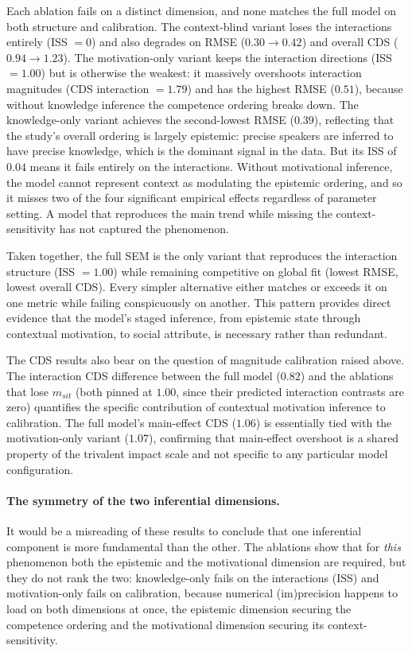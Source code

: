 \documentclass[12pt,a4paper]{article}
\begin{document}
Each ablation fails on a distinct dimension, and none matches the full model on
both structure and calibration. The context-blind variant loses the interactions
entirely (ISS $= 0$) and also degrades on RMSE ($0.30 \to 0.42$) and overall
CDS ($0.94 \to 1.23$). The motivation-only variant keeps the interaction
directions (ISS $= 1.00$) but is otherwise the weakest: it massively overshoots
interaction magnitudes (CDS interaction $= 1.79$) and has the highest RMSE
($0.51$), because without knowledge inference the competence ordering breaks
down. The knowledge-only variant achieves the second-lowest RMSE ($0.39$),
reflecting that the study's overall ordering is largely epistemic: precise
speakers are inferred to have precise knowledge, which is the dominant signal in
the data. But its ISS of $0.04$ means it fails entirely on the interactions.
Without motivational inference, the model cannot represent context as modulating
the epistemic ordering, and so it misses two of the four significant empirical
effects regardless of parameter setting. A model that reproduces the main trend
while missing the context-sensitivity has not captured the phenomenon.

Taken together, the full SEM is the only variant that reproduces the interaction
structure (ISS $= 1.00$) while remaining competitive on global fit (lowest RMSE,
lowest overall CDS). Every simpler alternative either matches or exceeds it on
one metric while failing conspicuously on another. This pattern provides
direct evidence that the model's staged inference, from epistemic state through
contextual motivation, to social attribute, is necessary rather than redundant.

The CDS results also bear on the question of magnitude calibration raised
above. The interaction CDS difference between the full model ($0.82$) and the
ablations that lose $m_{sit}$ (both pinned at $1.00$, since their predicted
interaction contrasts are zero) quantifies the specific contribution of
contextual motivation inference to calibration. The full model's main-effect CDS
($1.06$) is essentially tied with the motivation-only variant ($1.07$),
confirming that main-effect overshoot is a shared property of the trivalent
impact scale and not specific to any particular model configuration.

\paragraph{The symmetry of the two inferential dimensions.}
It would be a misreading of these results to conclude that one inferential
component is more fundamental than the other. The ablations show that for
\emph{this} phenomenon both the epistemic and the motivational dimension are
required, but they do not rank the two: knowledge-only fails on the interactions
(ISS) and motivation-only fails on calibration, because numerical (im)precision
happens to load on both dimensions at once, the epistemic dimension securing the
competence ordering and the motivational dimension securing its context-sensitivity.
\end{document}
